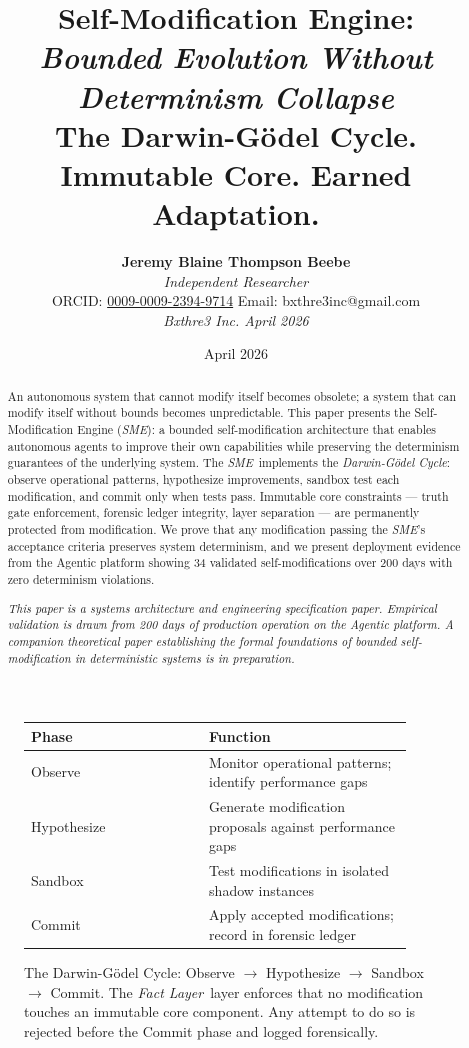 \documentclass[12pt]{article}
\title{
    \vspace{1.2cm}
    {\LARGE \textbf{Self-Modification Engine:}}\\[0.6em]
    {\large \textit{Bounded Evolution Without Determinism Collapse}\\[1.0em]}
    {\normalsize The Darwin-G\"odel Cycle. Immutable Core. Earned Adaptation.}
}
\author{
    \textbf{Jeremy Blaine Thompson Beebe}\\[0.2em]
    \textit{Independent Researcher}\\[0.3em]
    ORCID: \href{https://orcid.org/0009-0009-2394-9714}{0009-0009-2394-9714} \quad Email: bxthre3inc@gmail.com\\[0.3em]
    \textit{Bxthre3 Inc. \hfill April 2026}\\[0.3em]
}
\date{April 2026}
\newcommand{\fact}{\textit{Fact Layer}}
\newcommand{\sme}{\textit{SME}}
\newcommand{\dgcycle}{\textit{Darwin-G\"odel Cycle}}
\begin{document}
\maketitle

\begin{figure}[htbp]
\centering
\caption{The Darwin-G\"odel Cycle: Observe $\rightarrow$ Hypothesize $\rightarrow$ Sandbox $\rightarrow$ Commit. The \fact\ layer enforces that no modification touches an immutable core component. Any attempt to do so is rejected before the Commit phase and logged forensically.}
\label{fig:dg-cycle}
\bigskip
\begin{tabular}{p{0.42\linewidth}p{0.48\linewidth}}
\toprule
\textbf{Phase} & \textbf{Function} \\
\midrule
Observe & Monitor operational patterns; identify performance gaps \\
\midrule
Hypothesize & Generate modification proposals against performance gaps \\
\midrule
Sandbox & Test modifications in isolated shadow instances \\
\midrule
Commit & Apply accepted modifications; record in forensic ledger \\
\bottomrule
\end{tabular}
\end{figure}

\thispagestyle{fancy}

\begin{abstract}
\noindent
An autonomous system that cannot modify itself becomes obsolete; a system that can modify itself without bounds becomes unpredictable. This paper presents the Self-Modification Engine (\sme): a bounded self-modification architecture that enables autonomous agents to improve their own capabilities while preserving the determinism guarantees of the underlying system. The \sme\ implements the \dgcycle: observe operational patterns, hypothesize improvements, sandbox test each modification, and commit only when tests pass. Immutable core constraints — truth gate enforcement, forensic ledger integrity, layer separation — are permanently protected from modification. We prove that any modification passing the \sme's acceptance criteria preserves system determinism, and we present deployment evidence from the Agentic platform showing 34 validated self-modifications over 200 days with zero determinism violations.

\vspace{0.5em}
\noindent\textit{This paper is a systems architecture and engineering specification paper. Empirical validation is drawn from 200 days of production operation on the Agentic platform. A companion theoretical paper establishing the formal foundations of bounded self-modification in deterministic systems is in preparation.}
\end{abstract}
\end{document}
